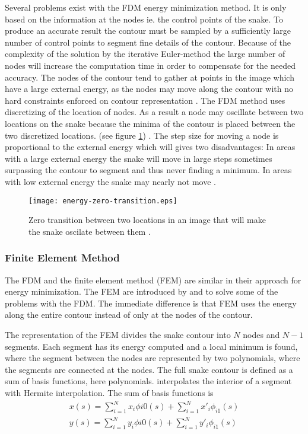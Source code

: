 Several problems exist with the FDM energy minimization method. It is
only based on the information at the nodes ie. the control points of
the snake. To produce an accurate result the contour must be sampled
by a sufficiently large number of control points to segment fine
details of the contour. Because of the complexity of the solution by
the iterative Euler-method the large number of nodes will increase the
computation time in order to compensate for the needed accuracy.  The
nodes of the contour tend to gather at points in the image which have
a large external energy, as the nodes may move along the contour with
no hard constraints enforced on contour representation
\citep{amini90}. The FDM method uses discretizing of the location of
nodes. As a result a node may oscillate between two locations on the
snake because the minima of the contour is placed between the two
discretized locations.  (see figure \ref{fig:energy-zero-transition})
\citep{cohen91}. The step size for moving a node is proportional to
the external energy which will gives two disadvantages: In areas with
a large external energy the snake will move in large steps sometimes
surpassing the contour to segment and thus never finding a minimum. In
areas with low external energy the snake may nearly not move
\citep{cohen91}.
\begin{figure}[htbp]
  \centering
  \texttt{[image: energy-zero-transition.eps]}
  \caption{Zero transition between two locations in an image that will make the snake oscilate between them \citep{cohen91}.}
  \label{fig:energy-zero-transition}
\end{figure}

\subsubsection{Finite Element Method}
\label{sec:finite-element-method}

The FDM and the finite element method (FEM) are similar in their
approach for energy minimization. The FEM are introduced by
\citep{cohen91} and \citep{cohen93} to solve some of the problems with
the FDM. The immediate difference is that FEM uses the energy along
the entire contour instead of only at the nodes of the contour.

The representation of the FEM divides the snake contour into $N$ nodes
and $N-1$ segments. Each segment has its energy computed and a local
minimum is found, where the segment between the nodes are represented
by two polynomials, where the segments are connected at the nodes. The
full snake contour is defined as a sum of basis functions, here
polynomials. \citet{cohen93} interpolates the interior of a segment
with Hermite interpolation. The sum of basis functions is
\begin{eqnarray}
  \nonumber
  x(s) = \sum^N_{i=1} x_i \phi{i0}(s) + \sum^N_{i=1} x'_i \phi_{i1}(s)\\
  y(s) = \sum^N_{i=1} y_i \phi{i0}(s) + \sum^N_{i=1} y'_i \phi_{i1}(s)\\
\end{eqnarray}

